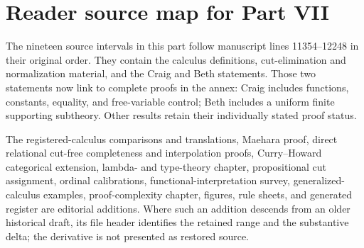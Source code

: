 \section*{Reader source map for Part VII}
\label{sec:p07-source-map}

The nineteen source intervals in this part follow manuscript lines
11354--12248 in their original order.  They contain the calculus definitions,
cut-elimination and normalization material, and the Craig and Beth statements.
Those two statements now link to complete proofs in the annex: Craig includes
functions, constants, equality, and free-variable control; Beth includes a
uniform finite supporting subtheory.  Other results retain their individually
stated proof status.

The registered-calculus comparisons and translations, Maehara proof,
direct relational cut-free completeness and interpolation proofs,
Curry--Howard categorical extension, lambda- and type-theory chapter,
propositional cut assignment, ordinal calibrations, functional-interpretation
survey, generalized-calculus examples, proof-complexity chapter, figures,
rule sheets, and generated register are editorial additions.  Where such an
addition descends from an older historical draft, its file header identifies
the retained range and the substantive delta; the derivative is not presented
as restored source.
